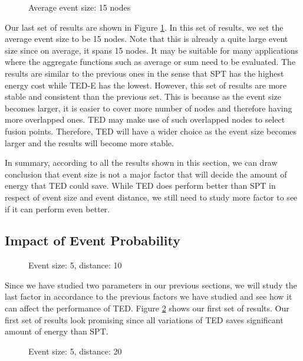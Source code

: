 \begin{figure}
\centering
{}
\caption{Average event size: 15 nodes}
\label{fig:sim-distance-size15}
\end{figure}

Our last set of results are shown in Figure \ref{fig:sim-distance-size15}. In this set of results, we set the average event size to be 15 nodes. Note that this is already a quite large event size since on average, it spans 15 nodes. It may be suitable for many applications where the aggregate functions such as average or sum need to be evaluated. The results are similar to the previous ones in the sense that SPT has the highest energy cost while TED-E has the lowest. However, this set of results are more stable and consistent than the previous set. This is because as the event size becomes larger, it is easier to cover more number of nodes and therefore having more overlapped ones. TED may make use of such overlapped nodes to select fusion points. Therefore, TED will have a wider choice as the event size becomes larger and the results will become more stable.

In summary, according to all the results shown in this section, we can draw conclusion that event size is not a major factor that will decide the amount of energy that TED could save. While TED does perform better than SPT in respect of event size and event distance, we still need to study more factor to see if it can perform even better.

\subsection{Impact of Event Probability}

\begin{figure}
\centering
{}
\caption{Event size: 5, distance: 10}
\label{fig:sim-prob-size5-dist10}
\end{figure}

Since we have studied two parameters in our previous sections, we will study the last factor in accordance to the previous factors we have studied and see how it can affect the performance of TED. Figure \ref{fig:sim-prob-size5-dist10} shows our first set of results. Our first set of results look promising since all variations of TED saves significant amount of energy than SPT.

\begin{figure}
\centering
{}
\caption{Event size: 5, distance: 20}
\label{fig:sim-prob-size5-dist20}
\end{figure}

